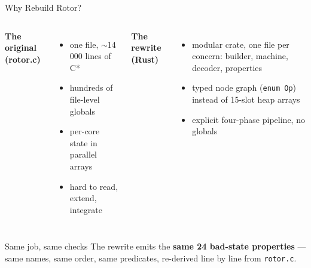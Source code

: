 \documentclass[aspectratio=169]{beamer}
\begin{document}
\begin{frame}{Why Rebuild Rotor?}
  \begin{columns}[T]
      \textbf{The original (rotor.c)}
      \begin{itemize}\setlength\itemsep{0.3em}
        \item one file, $\sim$14\,000 lines of C*
        \item hundreds of file-level globals
        \item per-core state in parallel arrays
        \item hard to read, extend, integrate
      \end{itemize}
      \textbf{The rewrite (Rust)}
      \begin{itemize}\setlength\itemsep{0.3em}
        \item modular crate, one file per concern:
              builder, machine, decoder, properties
        \item typed node graph (\texttt{enum Op}) instead of
              15-slot heap arrays
        \item explicit four-phase pipeline, no globals
      \end{itemize}
  \end{columns}
  \vspace{0.15cm}
  \begin{block}{Same job, same checks}
    The rewrite emits the \textbf{same 24 bad-state properties} ---
    same names, same order, same predicates, re-derived line by line
    from \texttt{rotor.c}.
  \end{block}
\end{frame}
\end{document}
